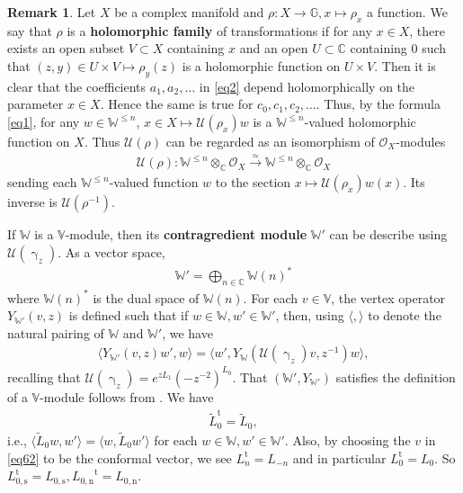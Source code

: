 \documentclass[12pt,a4paper,notitlepage]{article}
\theoremstyle{definition}
\newtheorem{rem}[df]{Remark}
\theoremstyle{plain}
\newcommand{\mc}{\mathcal}
\newcommand{\wtd}{\widetilde}
\newcommand{\tr}{\mathrm{t}} %
\newcommand{\bk}[1]{\langle {#1}\rangle}
\newcommand{\scr}{\mathscr}
\newcommand{\mbb}{\mathbb}
\newcommand{\Vbb}{\mathbb V}
\newcommand{\Wbb}{\mathbb W}
\newcommand{\Cbb}{\mathbb C}
\newcommand{\Lss}{L_{0,\mathrm{s}}}
\newcommand{\Lni}{{L_{0,\mathrm{n}}}}
\numberwithin{equation}{section}
\begin{document}
\begin{rem}\label{lb2}
Let $X$ be a complex manifold and $\rho:X\rightarrow\mbb G,x\mapsto \rho_x$ a function. We say that $\rho$ is a \textbf{holomorphic family} of transformations if for any $x\in X$, there exists an open subset $V\subset X$ containing $x$ and an open $U\subset\Cbb$ containing $0$ such that  $(z,y)\in U\times V\mapsto \rho_y(z)$ is a holomorphic function on $U\times V$. Then it is clear that the coefficients $a_1,a_2,\dots$ in \eqref{eq2} depend holomorphically on the parameter $x\in X$. Hence the same is true for $c_0,c_1,c_2,\dots$. Thus, by the formula \eqref{eq1}, for any $w\in\Wbb^{\leq n}$, $x\in X\mapsto \mc U(\rho_x)w$ is a $\Wbb^{\leq n}$-valued holomorphic function on $X$. Thus $\mc U(\rho)$ can be regarded as an isomorphism of  $\scr O_X$-modules 
\begin{align}
\mc U(\rho): \Wbb^{\leq n}\otimes_{\Cbb}\scr O_X\xrightarrow{\simeq}\Wbb^{\leq n}\otimes_{\Cbb}\scr O_X
\end{align}
sending each $\Wbb^{\leq n}$-valued function $w$ to the section $x\mapsto \mc U(\rho_x)w(x)$. \index{U@$\mc U(\rho)$} Its inverse is  $\mc U(\rho^{-1})$.
\end{rem}







If $\Wbb$ is a $\Vbb$-module, then its \textbf{contragredient module} $\Wbb'$ \index{W'@$\Wbb'$} can be describe using $\mc U(\upgamma_z)$. As a vector space,
\begin{align*}
\Wbb'=\bigoplus_{n\in\Cbb}\Wbb{(n)}^*
\end{align*}
where $\Wbb{(n)}^*$ is the dual space of $\Wbb{(n)}$. For each $v\in\Vbb$, the vertex operator $Y_{\Wbb'}(v,z)$ is defined such that if $w\in\Wbb,w'\in\Wbb'$, then, using $\bk{,}$ to denote the natural pairing of $\Wbb$ and $\Wbb'$, we have 
\begin{align}
\bk{Y_{\Wbb'}(v,z)w',w}=\bk{w',Y_\Wbb(\mc U(\upgamma_z)v,z^{-1})w},\label{eq62}
\end{align}
recalling that $\mc U(\upgamma_z)=e^{zL_1}(-z^{-2})^{L_0}$. That  $(\Wbb',Y_{\Wbb'})$ satisfies the definition of a $\Vbb$-module follows from \cite{FHL93}. We have 
\begin{align}
	\wtd L_0^\tr=\wtd L_0,\label{eq99}
\end{align}
i.e., $\bk{\wtd L_0w,w'}=\bk{w,\wtd L_0w'}$ for each $w\in\Wbb,w'\in\Wbb'$. Also, by choosing the $v$ in \eqref{eq62} to be the conformal vector, we see $L_n^\tr=L_{-n}$ and in particular $L_0^\tr=L_0$. So $\Lss^\tr=\Lss,\Lni^\tr=\Lni$.
\end{document}

